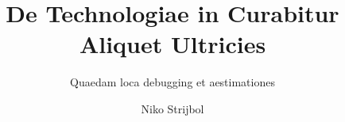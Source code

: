 \documentclass[
    paper=240mm:170mm,
    paper=portrait,
    parskip=half,
    cleardoublepage=plain,
    toc=chapterentrywithdots,
    fontsize=10pt,
]{scrbook}
\author{Niko Strijbol}
\title{De Technologiae in Curabitur Aliquet Ultricies}
\subtitle{Quaedam loca debugging et aestimationes}
\begin{document}
\frontmatter

{
    \selectfont\panno
    \maketitle
}



\tableofcontents





\mainmatter




%


%    
%    
\end{document}
